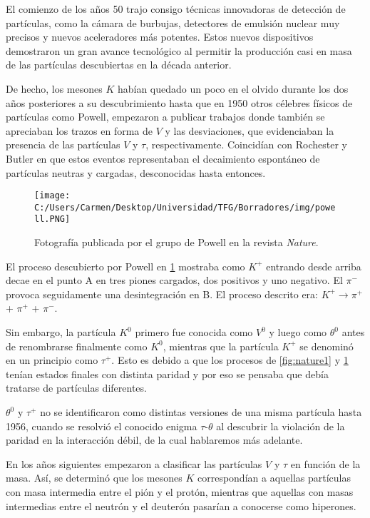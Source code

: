 El comienzo de los años 50 trajo consigo técnicas innovadoras de detección de partículas, como la cámara de burbujas, detectores de emulsión nuclear muy precisos y nuevos aceleradores más potentes. Estos nuevos dispositivos demostraron un gran avance tecnológico al permitir la producción casi en masa de las partículas descubiertas en la década anterior. 

De hecho, los mesones $K$ habían quedado un poco en el olvido durante los dos años posteriores a su descubrimiento hasta que en 1950 otros célebres físicos de partículas como Powell, empezaron a publicar trabajos donde también se apreciaban los trazos en forma de $V$ y las desviaciones, que evidenciaban la presencia de las partículas $V$ y $\tau$, respectivamente. Coincidían con Rochester y Butler en que estos eventos representaban el decaimiento espontáneo de partículas neutras y cargadas, desconocidas hasta entonces. 

\begin{figure}[h]
	\centering
	\texttt{[image: C:/Users/Carmen/Desktop/Universidad/TFG/Borradores/img/powell.PNG]}
	\caption[Fotografía de Powell mostrando una trayectoria ``kink'']
	{Fotografía publicada por el grupo de Powell en la revista \textit{Nature}. \cite{Griffiths2008}}
	\label{fig:powell}
\end{figure}

El proceso descubierto por Powell en \ref{fig:powell} mostraba como $K^+$ entrando desde arriba decae en el punto A en tres piones cargados, dos positivos y uno negativo. El $\pi^-$ provoca seguidamente una desintegración en B. El proceso descrito era: $K^+ \rightarrow \pi^+$ + $\pi^+$ +  $\pi^- $.

Sin embargo, la partícula $K^0$ primero fue conocida como $V^0$ y luego como $\theta^0$ antes de renombrarse finalmente como $K^0$, mientras que la partícula $K^+$ se denominó en un principio como $\tau^+$. Esto es debido a que los procesos de \ref{fig:nature1} y \ref{fig:powell} tenían estados finales con distinta paridad y por eso se pensaba que debía tratarse de partículas diferentes.

$\theta^0$ y $\tau^+$ no se identificaron como distintas versiones de una misma partícula hasta 1956, cuando se resolvió el conocido enigma $\tau$-$\theta$ al descubrir la violación de la paridad en la interacción débil, de la cual hablaremos más adelante. \cite{Griffiths2008}

En los años siguientes empezaron a clasificar las partículas $V$ y $\tau$ en función de la masa. Así, se determinó que los mesones $K$ correspondían a aquellas partículas con masa intermedia entre el pión y el protón, mientras que aquellas con masas intermedias entre el neutrón y el deuterón pasarían a conocerse como hiperones. 

